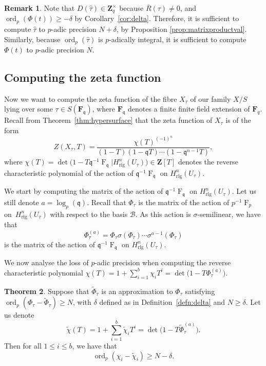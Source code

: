 \documentclass[a4paper,11pt]{article}
\numberwithin{equation}{section}
\newcommand{\ZZ}{\mathbf{Z}} %
\newcommand{\FF}{\mathbf{F}} %
\DeclareMathOperator{\ord}{ord}          %
\DeclareMathOperator{\Frob}{F}           %
\providecommand{\Hrig}{H_{\text{rig}}}  %
\providecommand{\cB}{\mathcal{B}} %
\theoremstyle{definition}
\newtheorem{thm}{Theorem}[section]
\newtheorem{rem}[thm]{Remark}
\begin{document}
\begin{rem}
Note that $D(\hat{\tau}) \in \ZZ_q^{\times}$ because $\overline{R}(\tau) \neq 0$, 
and $\ord_p(\Phi(t)) \geq -\delta$ by Corollary~\ref{cor:delta}. Therefore, it 
is sufficient to compute $\hat{\tau}$ to $p$-adic precision $N+\delta$, by
Proposition \ref{prop:matrixproductval}. Similarly, because $\ord_p(\hat{\tau})$ 
is $p$-adically integral, it is sufficient to compute $\Phi(t)$ to $p$-adic 
precision $N$.
\end{rem}

\subsection{Computing the zeta function}
\label{sec:ZetaFunctions}

Now we want to compute the zeta function of the fibre $X_{\tau}$ of
our family $X/S$ lying over some $\tau \in S(\FF_{\mathfrak{q}})$, 
where $\FF_{\mathfrak{q}}$ denotes a finite finite field extension of $\FF_q$.  
Recall from Theorem~\ref{thm:hypersurface} 
that the zeta function of $X_{\tau}$ is of the form
\begin{equation*}
Z(X_{\tau},T) = \frac{\chi(T)^{(-1)^n}}{(1 - T) (1 - \mathfrak{q}T) \dotsm (1 - \mathfrak{q}^{n-1}T)},
\end{equation*}
where $\chi(T) = \det \bigl( 1 - T \mathfrak{q}^{-1} \Frob_{\mathfrak{q}} | \Hrig^n(U_{\tau}) \bigr) \in \ZZ[T]$ 
denotes the reverse characteristic polynomial of the action 
of $\mathfrak{q}^{-1} \Frob_{\mathfrak{q}}$ 
on $\Hrig^n(U_{\tau})$.

We start by computing the matrix of the action 
of $\mathfrak{q}^{-1} \Frob_{\mathfrak{q}}$ on $\Hrig^n(U_{\tau})$. 
Let us still denote $a=\log_p(\mathfrak{q})$. Recall that $\Phi_{\tau}$ 
is the matrix of the action of $p^{-1} \Frob_p$ on~$\Hrig^{n}(U_{\tau})$ 
with respect to the basis $\cB$. As this action is $\sigma$-semilinear, 
we have that 
\begin{equation*}
\Phi_{\tau}^{(a)} = 
    \Phi_{\tau} \sigma(\Phi_{\tau}) \dotsm \sigma^{a-1}(\Phi_{\tau})
\end{equation*}
is the matrix of the action of $\mathfrak{q}^{-1} \Frob_{\mathfrak{q}}$ 
on $\Hrig^n(U_{\tau})$. 

We now analyse the loss of $p$-adic precision when computing 
the reverse characteristic polynomial 
$\chi(T)=1+\sum_{i=1}^b \chi_i T^i=\det\bigl( 1 - T \Phi_{\tau}^{(a)}\bigr)$.

\begin{thm} \label{thm:preccharpoly}
Suppose that $\tilde{\Phi}_{\tau}$ is an approximation to 
$\Phi_{\tau}$ satisfying
$\ord_p (\Phi_{\tau}-\tilde{\Phi}_{\tau}) \geq N$,
with $\delta$ defined as in Definition~\ref{defn:delta} and $N \geq \delta$. 
Let us denote
\[
\tilde{\chi}(T) = 1 + \sum_{i=1}^b \tilde{\chi}_i T^i 
                = \det\bigl( 1 - T \tilde{\Phi}_{\tau}^{(a)}\bigr).
\]
Then for all $1 \leq i \leq b$, we have that 
\[
\ord_p (\chi_i - \tilde{\chi}_i) \geq N-\delta.
\]
\end{thm}
\end{document}
